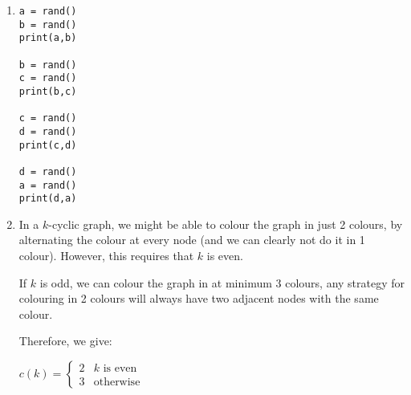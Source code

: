 \begin{enumerate}[label=(\alph*)]
\begin{enumerate}[label=(\roman*)]
      \item

\begin{verbatim}
a = rand()
b = rand()
print(a,b)

b = rand()
c = rand()
print(b,c)

c = rand()
d = rand()
print(c,d)

d = rand()
a = rand()
print(d,a)
\end{verbatim}

\item
  In a $k$-cyclic graph, we might be able to colour the graph in just 2 colours, by alternating the colour at every node (and we can clearly not do it in 1 colour). However, this requires that $k$ is even.

  If $k$ is odd, we can colour the graph in at minimum 3 colours, any strategy for colouring in 2 colours will always have two adjacent nodes with the same colour.

  Therefore, we give:

  $c(k) = \begin{cases}2 & k\text{ is even}\\3 & \text{otherwise}\end{cases}$

        
    \end{enumerate}
        
\end{enumerate}

